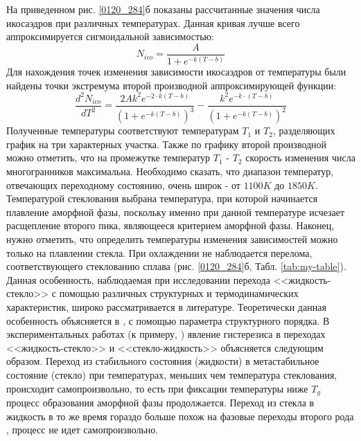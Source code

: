 На приведенном рис. \ref{0120_284}б  показаны рассчитанные значения числа  икосаэдров при различных температурах. Данная кривая лучше всего аппроксимируется сигмоидальной зависимостью:
\begin{equation}
N_{ico} = \frac{A}{1+e^{-k(T-b)}}
\label{eq_3}
\end{equation} 
Для нахождения точек изменения зависимости икосаэдров от температуры были найдены точки экстремума второй производной аппроксимирующей функции:
\begin{equation}
\frac{d^2N_{ico}}{dT^2} = \frac{2Ak^2e^{-2\cdot k(T-b)}}{(1 + e^{-k(T-b)})^3}-\frac{k^2e^{-k\cdot(T-b)}}{(1 + e^{-k(T-b)})^2 }
\label{eq_4}
\end{equation} 
Полученные температуры соответствуют температурам $T_1$ и $T_2$, разделяющих график на три характерных участка.  Также по графику второй производной можно отметить, что на промежутке температур $T_1$ - $T_2$ скорость изменения числа многогранников максимальна.
Необходимо сказать, что диапазон температур, отвечающих переходному состоянию, очень широк - от  $1100 K$ до $1850 K$. Температурой стеклования выбрана температура, при которой начинается плавление аморфной фазы, поскольку именно при данной температуре исчезает расщепление второго пика, являющееся критерием аморфной фазы.  Наконец, нужно отметить, что определить температуры изменения зависимостей можно только на плавлении стекла. При охлаждении не наблюдается перелома, соответствующего стеклованию сплава (рис. \ref{0120_284}б,  Табл. \ref{tab:my-table}). Данная особенность, наблюдаемая при исследовании перехода  <<жидкость-стекло>>  с помощью различных структурных и термодинамических характеристик, широко рассматривается в литературе. Теоретически данная особенность объясняется в \cite{tropin2015heat}, \cite{tropin2011dependence}  с помощью параметра структурного порядка. В экспериментальных работах (к примеру, \cite{aji2015kinetic}) явление гистерезиса в переходах <<жидкость-стекло>>  и  <<стекло-жидкость>>  объясняется следующим образом.  Переход из стабильного состояния (жидкости) в метастабильное состояние (стекло) при температурах, меньших чем температура стеклования, происходит самопроизвольно, то есть при фиксации температуры ниже $T_g$ процесс образования аморфной фазы продолжается. Переход из стекла в жидкость в то же время гораздо больше похож на фазовые переходы второго рода \cite{Dandar}, процесс не идет самопроизвольно.

